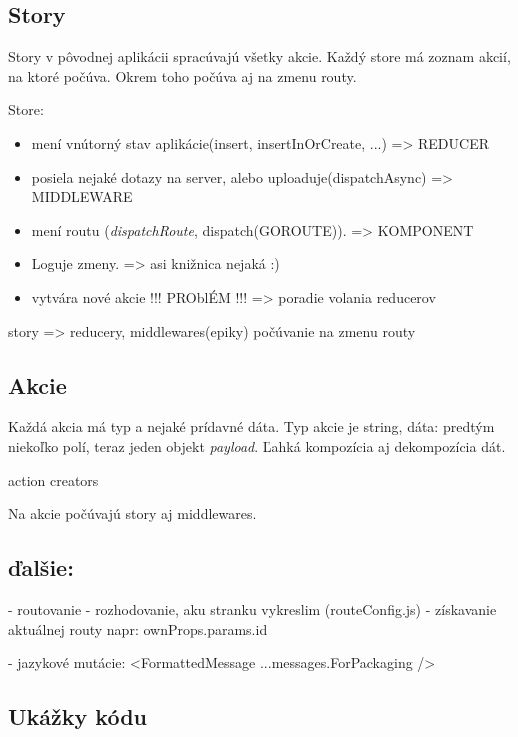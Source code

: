 \subsection{Story}
Story v pôvodnej aplikácii spracúvajú všetky akcie. Každý store má zoznam akcií, na ktoré počúva. Okrem toho počúva aj na zmenu routy.

Store:
\begin{itemize}
\item mení vnútorný stav aplikácie(insert, insertInOrCreate, ...) => REDUCER
\item posiela nejaké dotazy na server, alebo uploaduje(dispatchAsync) => MIDDLEWARE
\item mení routu (\emph{dispatchRoute}, dispatch(GOROUTE)). => KOMPONENT
\item Loguje zmeny. => asi knižnica nejaká :)
\item vytvára nové akcie !!! PROblÉM !!! => poradie volania reducerov %
\end{itemize}

story => reducery, middlewares(epiky)
počúvanie na zmenu routy

\subsection{Akcie}
Každá akcia má typ a nejaké prídavné dáta. %
Typ akcie je string, dáta: predtým niekoľko polí, teraz jeden objekt \emph{payload}. Ľahká kompozícia aj dekompozícia dát. %

action creators %

Na akcie počúvajú story aj middlewares.

\subsection{ďalšie:}
- routovanie
  - rozhodovanie, aku stranku vykreslim (routeConfig.js)
  - získavanie aktuálnej routy %
  napr: ownProps.params.id

- jazykové mutácie: <FormattedMessage {...messages.ForPackaging} />

\subsection{Ukážky kódu}


